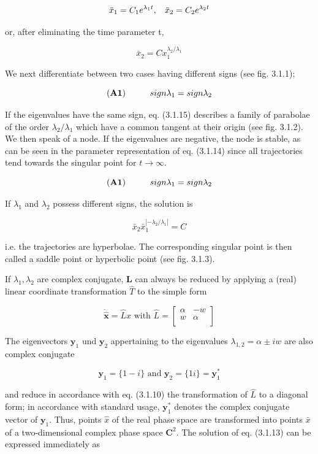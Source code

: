 \documentclass[12pt]{article}
\begin{document}
\[
\bar{x}_1 = C_1 e^{\lambda_1 t}, \hspace{3mm} \bar{x}_2 = C_2 e^{\lambda_2 t}
\]

or, after eliminating the time parameter t,

\[
\bar{x}_2 = C x_1^{\lambda_2 / \lambda_1}
\]

We next differentiate between two cases having different signs (see fig. 3.1.1);

\[
(\textbf{A1}) \hspace{10mm} sign \lambda_1 = sign \lambda_2
\]
 
If the eigenvalues have the same sign, eq. (3.1.15) describes a family of parabolae
of the order $\lambda_2/ \lambda_1$ which have a common tangent at their origin (see fig. 3.1.2).
We then speak of a node. If the eigenvalues are negative, the node is stable, as can
be seen in the parameter representation of eq. (3.1.14) since all trajectories tend
towards the singular point for $t \to \infty$.

\[
(\textbf{A1}) \hspace{10mm} sign \lambda_1 = sign \lambda_2
\]

If $\lambda_1$ and $\lambda_2$ possess different signs, the solution is

\[
\bar{x}_2 \bar{x}_1^{|-\lambda_2 / \lambda_1|} = C
\]

i.e. the trajectories are hyperbolae. The corresponding singular point is then called
a saddle point or hyperbolic point (see fig. 3.1.3).

\hfill

If $\lambda_1, \lambda_2$ are complex conjugate, \textbf{L} can always be reduced by applying a (real)
linear coordinate transformation $\hat{T}$ to the simple form

\[
\dot{\hat{\mathbf{x}}} = \hat{L}x \text{ with } \hat{L} = \begin{bmatrix}
\alpha & -w \\
w & \alpha \\
\end{bmatrix}
\]

The eigenvectors $\mathbf{y}_1$ und $\mathbf{y}_2$ appertaining to the eigenvalues $\lambda_{1,2} = \alpha \pm  i w$ are also
complex conjugate

\[
\mathbf{y}_1 = \{ 1 - i \} \text{ and } \mathbf{y}_2 = \{ 1 i \} = \mathbf{y}_1^{*}
\]

and reduce in accordance with eq. (3.1.10) the transformation of $\hat{L}$ to a diagonal form; in accordance with standard usage, $\mathbf{y}_1^*$ denotes the complex conjugate vector
of $\mathbf{y}_1$. Thus, points $\hat{x}$ of the real phase space are transformed into points $\bar{x}$ of a two-dimensional
complex phase space $ \mathbf{C}^2$. The solution of eq. (3.1.13) can be expressed
immediately as
\end{document}
